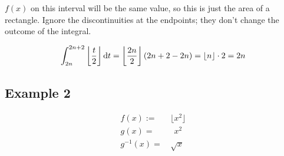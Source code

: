 \documentclass[12pt]{article}
\begin{document}
		$f(x)$ on this interval will be the same value, so this is just the area of a rectangle.
		Ignore the discontinuities at the endpoints; they don't change the outcome of the integral.

		\begin{align*}
			\int_{2n}^{2n+2}\left\lfloor\frac t2\right\rfloor\text dt
			= \left\lfloor\frac{2n}2\right\rfloor(2n+2-2n)
			= \lfloor n\rfloor\cdot2 = 2n
		\end{align*}

	\subsection*{Example 2}

		\begin{minipage}{0.5\textwidth}
			\begin{align*}
				f(x)     := & \, \big\lfloor x^2\big\rfloor\\
				g(x)      = & \, \phantom{\big\lfloor} x^2\\
				g^{-1}(x) = & \, \sqrt x\\
			\end{align*}
		\end{minipage}
\end{document}
